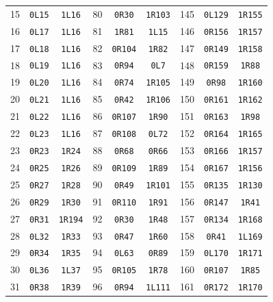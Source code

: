 \documentclass[10pt,a4paper]{article}
\begin{document}
\begin{center}
\begin{tabular}{rcc@{\hspace{14pt}}rcc@{\hspace{14pt}}rcc}
15 & \texttt{0L15} & \texttt{1L16} & 80 & \texttt{0R30} & \texttt{1R103} & 145 & \texttt{0L129} & \texttt{1R155} \\
16 & \texttt{0L17} & \texttt{1L16} & 81 & \texttt{1R81} & \texttt{1L15} & 146 & \texttt{0R156} & \texttt{1R157} \\
17 & \texttt{0L18} & \texttt{1L16} & 82 & \texttt{0R104} & \texttt{1R82} & 147 & \texttt{0R149} & \texttt{1R158} \\
18 & \texttt{0L19} & \texttt{1L16} & 83 & \texttt{0R94} & \texttt{0L7} & 148 & \texttt{0R159} & \texttt{1R88} \\
19 & \texttt{0L20} & \texttt{1L16} & 84 & \texttt{0R74} & \texttt{1R105} & 149 & \texttt{0R98} & \texttt{1R160} \\
20 & \texttt{0L21} & \texttt{1L16} & 85 & \texttt{0R42} & \texttt{1R106} & 150 & \texttt{0R161} & \texttt{1R162} \\
21 & \texttt{0L22} & \texttt{1L16} & 86 & \texttt{0R107} & \texttt{1R90} & 151 & \texttt{0R163} & \texttt{1R98} \\
22 & \texttt{0L23} & \texttt{1L16} & 87 & \texttt{0R108} & \texttt{0L72} & 152 & \texttt{0R164} & \texttt{1R165} \\
23 & \texttt{0R23} & \texttt{1R24} & 88 & \texttt{0R68} & \texttt{0R66} & 153 & \texttt{0R166} & \texttt{1R157} \\
24 & \texttt{0R25} & \texttt{1R26} & 89 & \texttt{0R109} & \texttt{1R89} & 154 & \texttt{0R167} & \texttt{1R156} \\
25 & \texttt{0R27} & \texttt{1R28} & 90 & \texttt{0R49} & \texttt{1R101} & 155 & \texttt{0R135} & \texttt{1R130} \\
26 & \texttt{0R29} & \texttt{1R30} & 91 & \texttt{0R110} & \texttt{1R91} & 156 & \texttt{0R147} & \texttt{1R41} \\
27 & \texttt{0R31} & \texttt{1R194} & 92 & \texttt{0R30} & \texttt{1R48} & 157 & \texttt{0R134} & \texttt{1R168} \\
28 & \texttt{0L32} & \texttt{1R33} & 93 & \texttt{0R47} & \texttt{1R60} & 158 & \texttt{0R41} & \texttt{1L169} \\
29 & \texttt{0R34} & \texttt{1R35} & 94 & \texttt{0L63} & \texttt{0R89} & 159 & \texttt{0L170} & \texttt{1R171} \\
30 & \texttt{0L36} & \texttt{1L37} & 95 & \texttt{0R105} & \texttt{1R78} & 160 & \texttt{0R107} & \texttt{1R85} \\
31 & \texttt{0R38} & \texttt{1R39} & 96 & \texttt{0R94} & \texttt{1L111} & 161 & \texttt{0R172} & \texttt{1R170} \\

\end{tabular}
\end{center}
\end{document}
